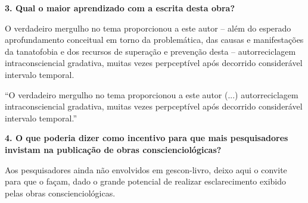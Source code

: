 \documentclass{gescons}
\begin{document}
\begin{multicols}{2}
\textbf{3. Qual o maior aprendizado com a escrita desta obra?}

O verdadeiro mergulho no tema proporcionou a este autor -- além do
esperado aprofundamento conceitual em torno da problemática, das causas
e manifestações da tanatofobia e dos recursos de superação e prevenção
desta -- autorreciclagem intraconsciencial gradativa, muitas vezes
perpceptível após decorrido considerável intervalo temporal.

\begin{pullquote}
    ``O verdadeiro mergulho no tema proporcionou a este autor  (...)  autorreciclagem intraconsciencial gradativa, muitas vezes perpceptível após decorrido considerável intervalo temporal.''
\end{pullquote}

\textbf{4. O que poderia dizer como incentivo para que mais pesquisadores invistam na publicação de obras conscienciológicas?}

Aos pesquisadores ainda não envolvidos em gescon-livro, deixo aqui o
convite para que o façam, dado o grande potencial de realizar
esclarecimento exibido pelas obras conscienciológicas.


    \end{multicols}
\end{document}
